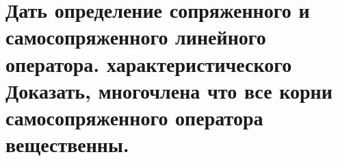 \section{
    Дать определение сопряженного и самосопряженного линейного оператора. характеристического Доказать, многочлена что все корни самосопряженного оператора вещественны.
}
